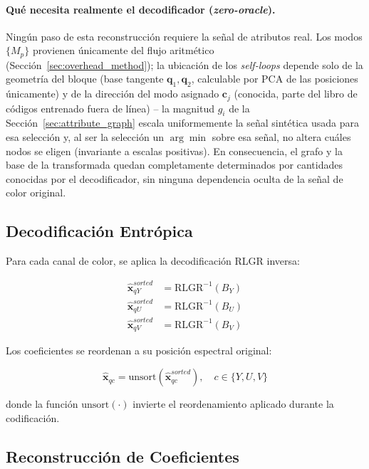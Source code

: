    \paragraph{Qué necesita realmente el decodificador (\textit{zero-oracle}).} Ningún paso de
   esta reconstrucción requiere la señal de atributos real. Los modos $\{M_p\}$ provienen
   únicamente del flujo aritmético (Sección~\ref{sec:overhead_method}); la ubicación de los
   \textit{self-loops} depende solo de la geometría del bloque (base tangente
   $\mathbf{q}_1,\mathbf{q}_2$, calculable por PCA de las posiciones únicamente) y de la
   dirección del modo asignado $\mathbf{c}_j$ (conocida, parte del libro de códigos entrenado
   fuera de línea) -- la magnitud $g_i$ de la Sección~\ref{sec:attribute_graph} escala
   uniformemente la señal sintética usada para esa selección y, al ser la selección un
   $\arg\min$ sobre esa señal, no altera cuáles nodos se eligen (invariante a escalas positivas).
   En consecuencia, el grafo y la base de la transformada quedan completamente determinados por
   cantidades conocidas por el decodificador, sin ninguna dependencia oculta de la señal de
   color original.\\

   \subsection{Decodificación Entrópica}
   
   Para cada canal de color, se aplica la decodificación RLGR inversa:
   
   \begin{align}
       \hat{\mathbf{x}}_{qY}^{sorted} &= \text{RLGR}^{-1}(B_Y) \\
       \hat{\mathbf{x}}_{qU}^{sorted} &= \text{RLGR}^{-1}(B_U) \\
       \hat{\mathbf{x}}_{qV}^{sorted} &= \text{RLGR}^{-1}(B_V)
   \end{align}
   
   Los coeficientes se reordenan a su posición espectral original:
   
   \begin{equation}
       \hat{\mathbf{x}}_{qc} = \text{unsort}(\hat{\mathbf{x}}_{qc}^{sorted}), \quad c \in \{Y,U,V\}
   \end{equation}
   
   donde la función $\text{unsort}(\cdot)$ invierte el reordenamiento aplicado durante la codificación.
   
   \subsection{Reconstrucción de Coeficientes}
   
